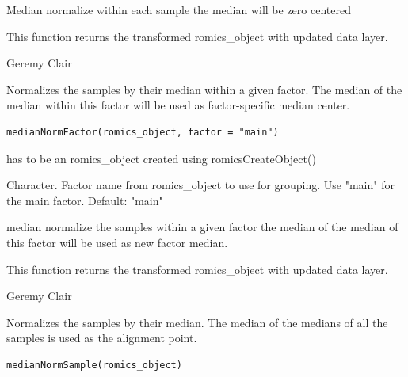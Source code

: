 \documentclass[a4paper]{book}
\begin{document}
%
\begin{Details}
Median normalize within each sample the median will be zero centered
\end{Details}
%
\begin{Value}
This function returns the transformed romics\_object with updated data layer.
\end{Value}
%
\begin{Author}
Geremy Clair
\end{Author}
%
\begin{Description}
Normalizes the samples by their median within a given factor. The median of the median within this factor will be used as factor-specific median center.
\end{Description}
%
\begin{Usage}
\begin{verbatim}
medianNormFactor(romics_object, factor = "main")
\end{verbatim}
\end{Usage}
%
\begin{Arguments}
\begin{ldescription}
\item[\code{romics\_object}] has to be an romics\_object created using romicsCreateObject()

\item[\code{factor}] Character. Factor name from romics\_object to use for grouping. Use "main" for the main factor. Default: "main"
\end{ldescription}
\end{Arguments}
%
\begin{Details}
median normalize the samples within a given factor the median of the median of this factor will be used as new factor median.
\end{Details}
%
\begin{Value}
This function returns the transformed romics\_object with updated data layer.
\end{Value}
%
\begin{Author}
Geremy Clair
\end{Author}
%
\begin{Description}
Normalizes the samples by their median. The median of the medians of all the samples is used as the alignment point.
\end{Description}
%
\begin{Usage}
\begin{verbatim}
medianNormSample(romics_object)
\end{verbatim}
\end{Usage}
\end{document}
